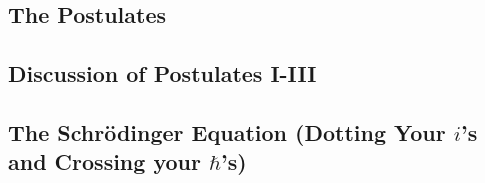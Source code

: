 \subsection{The Postulates}

\subsection{Discussion of Postulates I-III}

\subsection[The Schr\"odinger Equation]{The Schr\"odinger Equation (Dotting Your $i$'s and Crossing your $\hbar$'s)}
